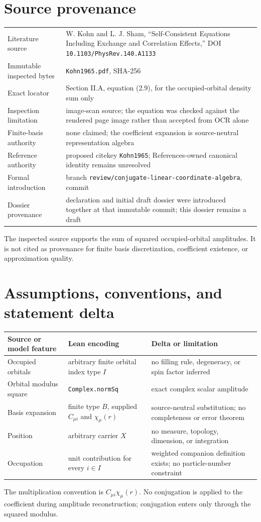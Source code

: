 \section{Source provenance}
\begin{tabularx}{\textwidth}{@{}lY@{}}
\toprule
Literature source & W. Kohn and L. J. Sham, ``Self-Consistent Equations Including Exchange and Correlation Effects,'' DOI \texttt{10.1103/PhysRev.140.A1133} \\
Immutable inspected bytes & \texttt{Kohn1965.pdf}, SHA-256  \\
Exact locator & Section II.A, equation (2.9), for the occupied-orbital density sum only \\
Inspection limitation & image-scan source; the equation was checked against the rendered page image rather than accepted from OCR alone \\
Finite-basis authority & none claimed; the coefficient expansion is source-neutral representation algebra \\
Reference authority & proposed citekey \texttt{Kohn1965}; References-owned canonical identity remains unresolved \\
Formal introduction & branch \texttt{review/conjugate-linear-coordinate-algebra}, commit  \\
Dossier provenance & declaration and initial draft dossier were introduced together at that immutable commit; this dossier remains a draft \\
\bottomrule
\end{tabularx}
The inspected source supports the sum of squared occupied-orbital amplitudes.  It is not cited as
provenance for finite basis discretization, coefficient existence, or approximation quality.

\section{Assumptions, conventions, and statement delta}
\begin{tabularx}{\textwidth}{@{}YYY@{}}
\toprule
Source or model feature & Lean encoding & Delta or limitation \\
\midrule
Occupied orbitals & arbitrary finite orbital index type $I$ & no filling rule, degeneracy, or spin factor inferred \\
Orbital modulus square & \texttt{Complex.normSq} & exact complex scalar amplitude \\
Basis expansion & finite type $B$, supplied $C_{\mu i}$ and $\chi_\mu(r)$ & source-neutral substitution; no completeness or error theorem \\
Position & arbitrary carrier $X$ & no measure, topology, dimension, or integration \\
Occupation & unit contribution for every $i\in I$ & weighted companion definition exists; no particle-number constraint \\
\bottomrule
\end{tabularx}
The multiplication convention is $C_{\mu i}\chi_\mu(r)$.  No conjugation is applied to the
coefficient during amplitude reconstruction; conjugation enters only through the squared modulus.

